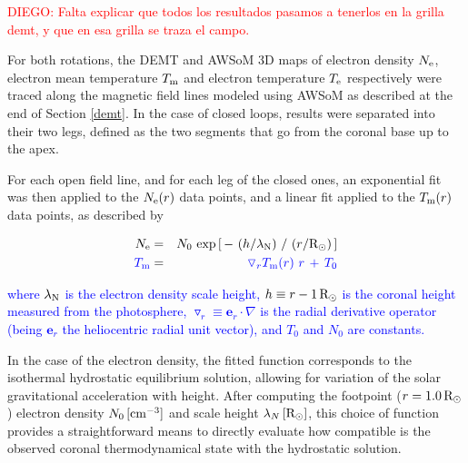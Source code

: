 \documentclass[namedreferences]{solarphysics}
\renewcommand{\l}{\lambda_{\rm N}}%
\newcommand{\mrsun}{{\rm R_\odot}}
\newcommand{\cm}{{\rm cm}}
\newcommand{\lN}{\lambda_N}
\newcommand{\dr}{\triangledown_r}
\newcommand{\er}{\mathbf{e}_r}
\newcommand{\Te}{T_{\rm e}}
\newcommand{\Tm}{T_{\rm m}}
\newcommand{\Ne}{N_{\rm e}}
\def\diego#1{\textcolor{red}{DIEGO: #1}}
\def\albert#1{\textcolor{blue}{#1}}
\def\temp#1{\textcolor{mygray}{#1}}
\begin{document}
\begin{article}
\diego{Falta explicar que todos los resultados pasamos a tenerlos en la grilla demt, y que en esa grilla se traza el campo.}

For both rotations, the DEMT and AWSoM 3D maps of electron density $\Ne$, electron mean temperature $\Tm$ and electron temperature $\Te$ respectively were traced along the magnetic field lines modeled using AWSoM as described at the end of Section \ref{demt}. In the case of closed loops, results were separated into their two legs, defined as the two segments that go from the coronal base up to the apex.

For each open field line, and for each leg of the closed ones, an exponential fit was then applied to the $\Ne(r)$ data points, and a linear fit applied to the $\Tm(r)$ data points, as described by

\begin{eqnarray}\label{Nfit}
\Ne &=& N_0\,\exp{\left[\,-\,\left(h/\l\right)\,/\,\left(r/\mrsun\right)\,\right]}\\
\label{Tfit}
\albert{\Tm} &=& \albert{\dr \Tm(r) \ r\,+\,T_0}
\end{eqnarray}
 
\noindent
\albert{where $\l$ is the electron density scale height, $h \equiv r - 1\,\mrsun$ is the coronal height measured from the photosphere, $\dr\equiv\er\cdot\nabla$ is the radial derivative operator (being $\er$ the heliocentric radial unit vector), and $T_0$ and $N_0$ are constants.}

In the case of the electron density, the fitted function corresponds to the isothermal hydrostatic equilibrium solution, allowing for variation of the solar gravitational acceleration with height. After computing the footpoint ($r=1.0\,\mrsun$) electron density $N_{0}\,[\cm^{-3}]$ and scale height $\lN\,[\mrsun]$\temp{, this choice of function provides a straightforward means to directly evaluate how compatible is the observed coronal thermodynamical state with the hydrostatic solution}.




\end{article}
\end{document}

